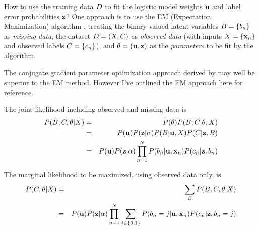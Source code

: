 \documentclass{article}
\begin{document}
How to use the training data $D$ to fit the logistic model weights ${\bf u}$ and label error probabilities ${\bf z}$?
One approach is to use the EM (Expectation Maximization) algorithm \cite{DempsterLairdRubin77},
treating the binary-valued latent variables $B = \{ b_n \}$ as {\em missing data},
the dataset $D = (X,C)$ as {\em observed data}
(with inputs $X = \{ {\bf x}_n \}$ and observed labels $C = \{ c_n \}$),
and $\theta = ({\bf u},{\bf z})$ as the {\em parameters} to be fit by the algorithm.

The conjugate gradient parameter optimization approach
derived by \cite{BootkrajangKaban2012} may well be superior to the EM method.
However I've outlined the EM approach here for reference.

The joint likelihood including observed and missing data is
\begin{eqnarray*}
  P(B,C,\theta|X)
  & = & P(\theta) P(B,C|\theta,X) \\
  & = & P({\bf u}) P({\bf z}|\alpha) P(B|{\bf u},X) P(C|{\bf z},B) \\
  & = & P({\bf u}) P({\bf z}|\alpha) \prod_{n=1}^{N} P(b_{n}|{\bf u},{\bf x}_{n}) P(c_{n}|{\bf z},b_{n})
\end{eqnarray*}

The marginal likelihood to be maximized, using observed data only, is
\begin{eqnarray*}
  P(C,\theta|X) & = & \sum_{B} P(B,C,\theta|X) \\
  & = & P({\bf u}) P({\bf z}|\alpha) \prod_{n=1}^{N} \sum_{j \in \{0,1\}} P(b_{n}=j|{\bf u},{\bf x}_{n}) P(c_{n}|{\bf z},b_{n}=j)
\end{eqnarray*}
\end{document}
